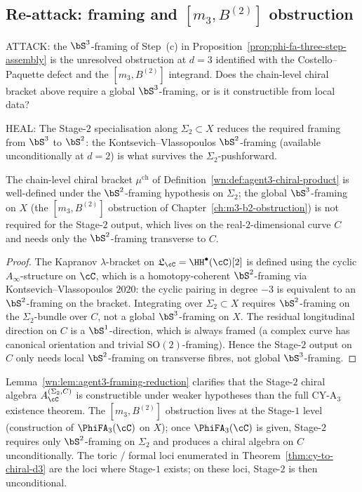 \subsection{Re-attack: framing and $[m_3,B^{(2)}]$ obstruction}
\label{wn:subsec:agent3-framing-reattack}

ATTACK: the $\bS^3$-framing of Step~(c) in Proposition~\ref{prop:phi-fa-three-step-assembly} is the unresolved obstruction at $d=3$ identified with the Costello--Paquette defect and the $[m_3,B^{(2)}]$ integrand. Does the chain-level chiral bracket above require a global $\bS^3$-framing, or is it constructible from local data?

HEAL: The Stage-$2$ specialisation along $\Sigma_2\subset X$ reduces the required framing from $\bS^3$ to $\bS^2$: the Kontsevich--Vlassopoulos $\bS^2$-framing (available unconditionally at $d=2$) is what survives the $\Sigma_2$-pushforward.

\begin{lemma}
\label{wn:lem:agent3-framing-reduction}
\ClaimStatusProvedHere
The chain-level chiral bracket $\mu^{\mathrm{ch}}$ of Definition~\ref{wn:def:agent3-chiral-product} is well-defined under the $\bS^2$-framing hypothesis on $\Sigma_2$; the global $\bS^3$-framing on $X$ (the $[m_3,B^{(2)}]$ obstruction of Chapter~\ref{ch:m3-b2-obstruction}) is not required for the Stage-$2$ output, which lives on the real-$2$-dimensional curve $C$ and needs only the $\bS^2$-framing transverse to $C$.
\end{lemma}

\begin{proof}
The Kapranov $\lambda$-bracket on $\mathfrak{L}_\cC=\HH^\bullet(\cC)[2]$ is defined using the cyclic $A_\infty$-structure on $\cC$, which is a homotopy-coherent $\bS^2$-framing via Kontsevich--Vlassopoulos $2020$: the cyclic pairing in degree $-3$ is equivalent to an $\bS^2$-framing on the bracket. Integrating over $\Sigma_2\subset X$ requires $\bS^2$-framing on the $\Sigma_2$-bundle over $C$, not a global $\bS^3$-framing on $X$. The residual longitudinal direction on $C$ is a $\bS^1$-direction, which is always framed (a complex curve has canonical orientation and trivial $\mathrm{SO}(2)$-framing). Hence the Stage-$2$ output on $C$ only needs local $\bS^2$-framing on transverse fibres, not global $\bS^3$-framing.
\end{proof}

\begin{remark}
\label{wn:rem:agent3-cya3-bypass}
Lemma~\ref{wn:lem:agent3-framing-reduction} clarifies that the Stage-$2$ chiral algebra $A^{(\Sigma_2,C)}_\cC$ is constructible under weaker hypotheses than the full CY-A$_3$ existence theorem. The $[m_3,B^{(2)}]$ obstruction lives at the Stage-$1$ level (construction of $\PhiFA_3(\cC)$ on $X$); once $\PhiFA_3(\cC)$ is given, Stage-$2$ requires only $\bS^2$-framing on $\Sigma_2$ and produces a chiral algebra on $C$ unconditionally. The toric / formal loci enumerated in Theorem~\ref{thm:cy-to-chiral-d3} are the loci where Stage-$1$ exists; on these loci, Stage-$2$ is then unconditional.
\end{remark}


